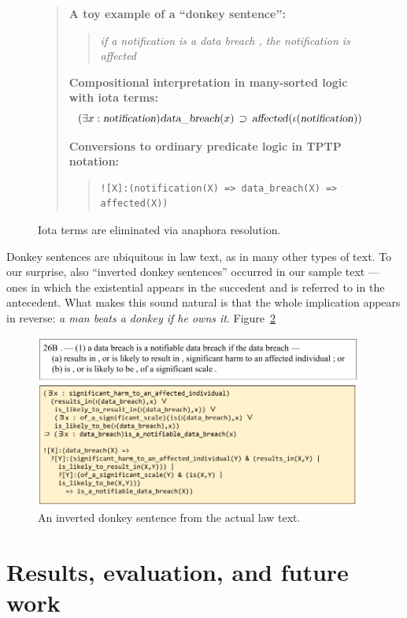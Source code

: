 \documentclass{IOS-Book-Article}
\newcommand{\eop}[1]{\mbox{\textsl{#1}}}
\newcommand{\bequ}{\begin{quote}}
\newcommand{\enqu}{\end{quote}}
\begin{document}
 \begin{figure}
  \begin{framed}
  \bequ
  \textbf{A toy example of a ``donkey sentence'':}
  \bequ
 \textit{if a notification is a data breach , the notification is affected}
 \enqu

 \textbf{Compositional interpretation in many-sorted logic with iota terms:}
 \[
(\exists x : \eop{notification})\eop{data\_breach}(x) \, \supset \, \eop{affected}(\iota(\eop{notification}))
\]

 \textbf{Conversions to ordinary predicate logic in TPTP notation:}
 \bequ
\begin{verbatim}
![X]:(notification(X) => data_breach(X) => affected(X))
\end{verbatim}
 \enqu
 \enqu
   \end{framed}
 \caption{Iota terms are eliminated via anaphora resolution.
 }
\label{anaphora}
\end{figure}

Donkey sentences are ubiquitous in law text, as in many other types of text.
To our surprise, also ``inverted donkey sentences'' occurred in our sample text --- ones in which the existential appears in the succedent and is referred to in the antecedent.
What makes this sound natural is that the whole implication appears in reverse: \textit{a man beats a donkey if he owns it}.
Figure~\ref{donkey}



\begin{figure}
 \includegraphics[width=0.96\textwidth]{anaphora.png}
\caption{An inverted donkey sentence from the actual law text.}
\label{donkey}
\end{figure}

\section{Results, evaluation, and future work}
\end{document}
